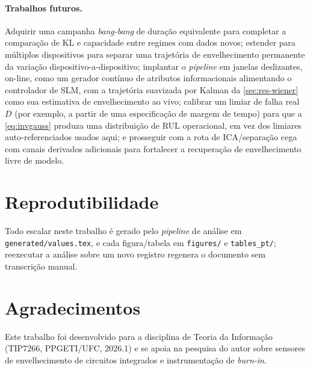 \paragraph{Trabalhos futuros.} Adquirir uma campanha \emph{bang-bang} de
duração equivalente para completar a comparação de KL e capacidade
entre regimes com dados novos; estender para múltiplos dispositivos para
separar uma trajetória de envelhecimento permanente da variação
dispositivo-a-dispositivo; implantar o \emph{pipeline} em janelas
deslizantes, on-line, como um gerador contínuo de atributos informacionais
alimentando o controlador de SLM, com a trajetória suavizada por Kalman da
\cref{sec:res-wiener} como sua estimativa de envelhecimento ao vivo;
calibrar um limiar de falha real $D$ (por exemplo, a partir de uma
especificação de margem de tempo) para que a \cref{eq:invgauss} produza uma
distribuição de RUL operacional, em vez dos limiares auto-referenciados
usados aqui; e prosseguir com a rota de ICA/separação cega com canais
derivados adicionais para fortalecer a recuperação de envelhecimento livre
de modelo.

\section*{Reprodutibilidade}
Todo escalar neste trabalho é gerado pelo \emph{pipeline} de análise em
\texttt{generated/values.tex}, e cada figura/tabela em \texttt{figures/} e
\texttt{tables\_pt/}; reexecutar a análise sobre um novo registro
regenera o documento sem transcrição manual.

\section*{Agradecimentos}
Este trabalho foi desenvolvido para a disciplina de Teoria da Informação
(TIP7266, PPGETI/UFC, 2026.1) e se apoia na pesquisa do autor sobre sensores
de envelhecimento de circuitos integrados e instrumentação de \emph{burn-in}.
